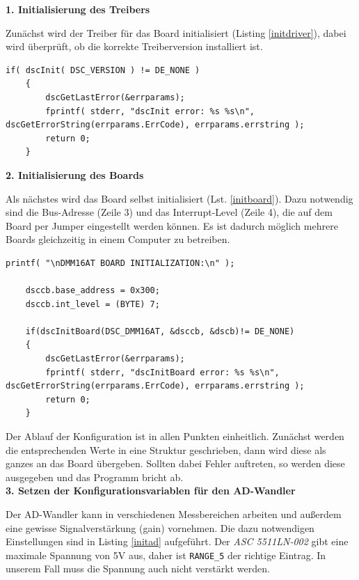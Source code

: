\documentclass[12pt,a4paper,twoside,BCOR=12.5mm]{scrartcl}
\begin{document}
\textbf{1. Initialisierung des Treibers}

 Zunächst wird der Treiber für das Board initialisiert (Listing \ref{initdriver}), dabei wird überprüft, ob die korrekte Treiberversion installiert ist.
\begin{lstlisting}[frame=trBL]
	if( dscInit( DSC_VERSION ) != DE_NONE )
	{
		dscGetLastError(&errparams);
		fprintf( stderr, "dscInit error: %s %s\n", dscGetErrorString(errparams.ErrCode), errparams.errstring );
		return 0;
	}
\end{lstlisting}


\textbf{2. Initialisierung des Boards}

Als nächstes wird das Board selbst initialisiert (Lst. \ref{initboard}). Dazu notwendig sind die Bus-Adresse (Zeile 3) und das Interrupt-Level (Zeile 4), die auf dem Board per Jumper eingestellt werden können. Es ist dadurch möglich mehrere Boards gleichzeitig in einem Computer zu betreiben.

\begin{lstlisting}[frame=trBL]
	printf( "\nDMM16AT BOARD INITIALIZATION:\n" );

	dsccb.base_address = 0x300;
	dsccb.int_level = (BYTE) 7;

	if(dscInitBoard(DSC_DMM16AT, &dsccb, &dscb)!= DE_NONE)
	{
		dscGetLastError(&errparams);
		fprintf( stderr, "dscInitBoard error: %s %s\n", dscGetErrorString(errparams.ErrCode), errparams.errstring );
		return 0;
	}
\end{lstlisting}

Der Ablauf der Konfiguration ist in allen Punkten einheitlich. Zunächst werden die entsprechenden Werte in eine Struktur geschrieben, dann wird diese als ganzes an das Board übergeben. Sollten dabei Fehler auftreten, so werden diese ausgegeben und das Programm bricht ab. \\

\textbf{3. Setzen der Konfigurationsvariablen für den AD-Wandler}

Der AD-Wandler kann in verschiedenen Messbereichen arbeiten und außerdem eine gewisse Signalverstärkung (gain) vornehmen. Die dazu notwendigen Einstellungen sind in Listing \ref{initad} aufgeführt. 
Der \textit{ASC 5511LN-002} gibt eine maximale Spannung von 5V aus, daher ist \texttt{RANGE\_5} der richtige Eintrag. In unserem Fall muss die Spannung auch nicht verstärkt werden. 
\end{document}
